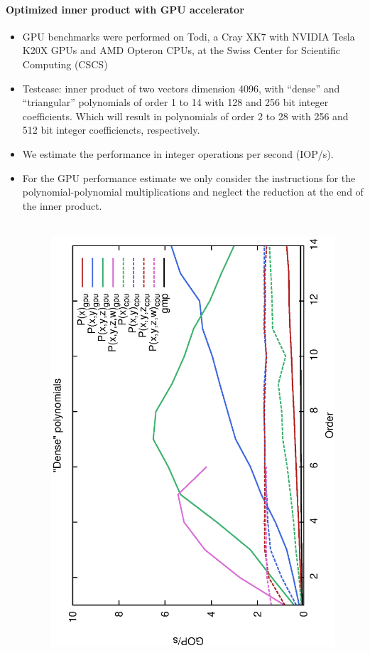\documentclass[oribibl]{llncs2e/llncs}
\begin{document}
\paragraph{Optimized inner product with GPU accelerator}
\begin{itemize}
\item GPU benchmarks were performed on Todi, a Cray XK7 with NVIDIA Tesla K20X GPUs and AMD Opteron CPUs, at the Swiss Center for Scientific Computing (CSCS)
\item Testcase: inner product of two vectors dimension 4096, with ``dense'' and
``triangular'' polynomials of order 1 to 14 with 128 and 256 bit integer
coefficients. Which will result in polynomials of order 2 to 28 with 256 and 512 bit integer coefficiencts, respectively.
\item We estimate the performance in integer operations per second (IOP/s).
\item For the GPU performance estimate we only consider the instructions for the polynomial-polynomial multiplications and neglect the reduction at the end of the inner product.
\begin{figure}[t!]
    \begin{center}
    \mbox{
        \hspace{-0.5cm}
        \includegraphics[scale=0.37, angle=-90]{ME128.eps} 
}
\end{center}
\end{figure}
\end{itemize}
\end{document}
